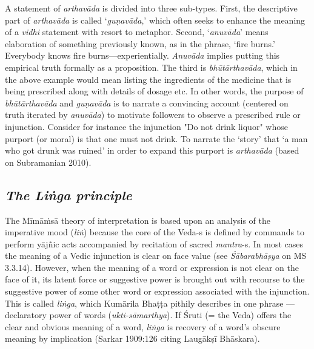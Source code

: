 A statement of \textit{arthavāda} is divided into three sub-types. First, the descriptive part of \textit{arthavāda} is called ‘\textit{guṇavāda},’ which often seeks to enhance the meaning of a \textit{vidhi }statement with resort to metaphor. Second, ‘\textit{anuvāda}’ means elaboration of something previously known, as in the phrase, ‘fire burns.’ Everybody knows fire burns—experientially. \textit{Anuvāda} implies putting this empirical truth formally as a proposition. The third is \textit{bhūtārthavāda}, which in the above example would mean listing the ingredients of the medicine that is being prescribed along with details of dosage etc. In other words, the purpose of \textit{bhūtārthavāda} and \textit{guṇavāda }is to narrate a convincing account (centered on truth iterated by \textit{anuvāda}) to motivate followers to observe a prescribed rule or injunction. Consider for instance the injunction "Do not drink liquor" whose purport (or moral) is that one must not drink. To narrate the ‘story’ that ‘a man who got drunk was ruined’ in order to expand this purport is \textit{arthavāda} (based on Subramanian 2010).


\subsection*{\textit{The Liṅga principle}}

The Mīmāṁsā theory of interpretation is based upon an analysis of the imperative mood (\textit{liṅ}) because the core of the Veda-s is defined by commands to perform yājñic acts accompanied by recitation of sacred \textit{mantra}-s. In most cases the meaning of a Vedic injunction is clear on face value (see \textit{Śābarabhāṣya} on MS 3.3.14). However, when the meaning of a word or expression is not clear on the face of it, its latent force or suggestive power is brought out with recourse to the suggestive power of some other word or expression associated with the injunction. This is called \textit{liṅga}, which Kumārila Bhaṭṭa pithily describes in one phrase — declaratory power of words (\textit{ukti-sāmarthya}). If Śruti (= the Veda) offers the clear and obvious meaning of a word, \textit{liṅga} is recovery of a word’s obscure meaning by implication (Sarkar 1909:126 citing Laugākṣī Bhāskara).



